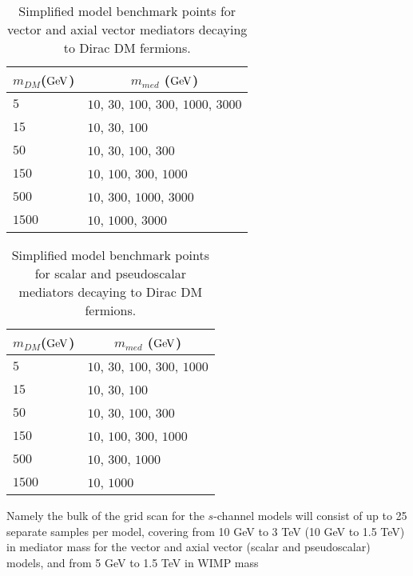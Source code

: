 \documentclass[debug,notitlepage]{dmfm}
\newcommand{\mdm}{\ensuremath{m_{DM}}\xspace}
\begin{document}
\begin{table}[!ht]
\centering
\begin{tabular}{| l | l |}
\hline
\multicolumn{1}{|c|}{\mdm (${\rm GeV}$)} & \multicolumn{1}{c|}{$m_{med}$ (${\rm GeV}$)} \\
\hline
 $5$    & $10$, $30$, $100$, $300$, $1000$, $3000$\\
 $15$   & $10$, $30$, $100$ \\
 $50$   & $10$, $30$, $100$, $300$ \\
 $150$  & $10$, \hspace{12pt} $100$, $300$, $1000$\\
 $500$  & $10$, \hspace{33pt} $300$, $1000$, $3000$  \\
 $1500$  &  $10$,\hspace{57pt} $1000$, $3000$ \\
\hline
\end{tabular}
\caption{Simplified model benchmark points for vector and axial vector mediators
decaying to Dirac DM fermions.}
\label{tab:mMedmDM_VA}
\end{table}

\begin{table}[!ht]
\centering
\begin{tabular}{| l | l |}
\hline
\multicolumn{1}{|c|}{\mdm (${\rm GeV}$)} & \multicolumn{1}{c|}{$m_{med}$ (${\rm GeV}$)} \\
\hline
 $5$    & $10$, $30$, $100$, $300$, $1000$\\
 $15$   & $10$, $30$, $100$ \\
 $50$   & $10$, $30$, $100$, $300$ \\
 $150$  & $10$, \hspace{12pt} $100$, $300$, $1000$\\
 $500$  & $10$, \hspace{33pt} $300$, $1000$ \\
 $1500$  &  $10$,\hspace{57pt} $1000$ \\
\hline
\end{tabular}
\caption{Simplified model benchmark points for scalar and pseudoscalar mediators
decaying to Dirac DM fermions.}
\label{tab:mMedmDM_SP}
\end{table}


Namely the bulk of the grid scan for
the $s$-channel models will consist of up to 25 separate
samples per model, covering from 10 GeV to 3 TeV (10 GeV to 1.5 TeV)
in mediator mass for the vector and axial vector (scalar and pseudoscalar) models,
and from 5 GeV to 1.5 TeV in WIMP mass
\end{document}
